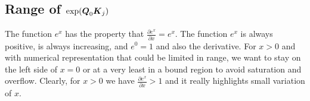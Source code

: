 \documentclass[conference]{IEEEtran}
\begin{document}
\begin{comment}
\begin{equation*}
  \Vc{r}_{0,t-1} =
  \frac{\sum_{j=0}^{t-1}(\exp{\Vc{Q}_0\Vc{K}_j})\Vc{V}_j}{\sum_{j=0}^{t-1}\exp{\Vc{Q}_0\Vc{K}_j}}
\end{equation*}
\begin{equation*}
  \Vc{r}_{t,n} = \frac{\sum_{j=t}^{n}(\exp{\Vc{Q}_0\Vc{K}_j})\Vc{V}_j}{\sum_{j=t}^n\exp{\Vc{Q}_0\Vc{K}_j}}
\end{equation*}

\begin{equation}
  \Vc{D}_{\iota,\ell} = \sum_{j=\iota}^{\ell}\exp{\Vc{Q}_0\Vc{K}_j}
\end{equation}
\begin{equation}
  \Vc{D}_{0,n} = \Vc{D}_{0,t-1} + \Vc{D}_{t,n}
\end{equation}
\begin{equation*}
  \Vc{R}_0 = \frac{\Vc{D}_{0,t-1}}{\Vc{D}_{0,t-1} + \Vc{D}_{t,n}}\Vc{r}_{0,t-1}  +  \frac{\Vc{D}_{t,n}}{\Vc{D}_{0,t-1} + \Vc{D}_{t,n}}\Vc{r}_{t,n} 
\end{equation*}
The fraction is actually a scalar operation: it is an element wise
scalar to be multiplied to $\Vc{r}_{0,i}$

\begin{equation*}
  \Vc{r}_{0,t+1} = \frac{\Vc{D}_{0,t-1}}{\Vc{D}_{0,t-1} + \Vc{D}_{t,t+1}}\Vc{r}_{0,t-1}  +  \frac{\Vc{D}_{t,t+1}}{\Vc{D}_{0,t-1} + \Vc{D}_{t,t+1}}\Vc{r}_{t,t+1} 
\end{equation*}

The Divion does not need to be done step by step but only at the
end. So we have a matrix update iteration as in Equation \ref{eq:sum0}
and \ref{eq:sum1}, and we can conclude with the final result in
Equation \ref{eq:res} and \ref{eq:resall}.
\end{comment}

\subsection{Range of $\exp({\boldsymbol Q}_0{\boldsymbol K}_j)$}
\label{sec:range}
The function $e^x$ has the property that $\frac{\partial e^x}{\partial
  x}= e^x$. The function $e^x$ is always positive, is always
increasing, and $e^0=1$ and also the derivative. For $x>0$ and with
numerical representation that could be limited in range, we want to
stay on the left side of $x=0$ or at a very least in a bound region to
avoid saturation and overflow. Clearly, for $x>0$ we have
$\frac{\partial e^x}{\partial x}>1$ and it really highlights small
variation of $x$.
\end{document}
